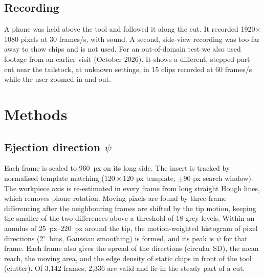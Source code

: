 \documentclass[conference,a4paper]{IEEEtran}
\newcommand{\degr}{\ensuremath{^\circ}}
\begin{document}
\subsection{Recording}
A phone was held above the tool and followed it along the cut.
It recorded 1920$\times$1080 pixels at 30 frames/s, with sound.
A second, side-view recording was too far away to show chips and is not used.
For an out-of-domain test we also used footage from an earlier visit (October 2026).
It shows a different, stepped part cut near the tailstock, at unknown settings, in 15 clips recorded at 60 frames/s while the user zoomed in and out.

\section{Methods}
\subsection{Ejection direction $\psi$}\label{sec:m-eject}
Each frame is scaled to \SI{960}{px} on its long side.
The insert is tracked by normalised template matching ($120\times120$ px template, $\pm90$ px search window).
The workpiece axis is re-estimated in every frame from long straight Hough lines, which removes phone rotation.
Moving pixels are found by three-frame differencing after the neighbouring frames are shifted by the tip motion, keeping the smaller of the two differences above a threshold of 18 grey levels.
Within an annulus of \SIrange{25}{220}{px} around the tip, the motion-weighted histogram of pixel directions (2\degr\ bins, Gaussian smoothing) is formed, and its peak is $\psi$ for that frame.
Each frame also gives the spread of the directions (circular SD), the mean reach, the moving area, and the edge density of static chips in front of the tool (clutter).
Of 3,142 frames, 2,336 are valid and lie in the steady part of a cut.
\end{document}
